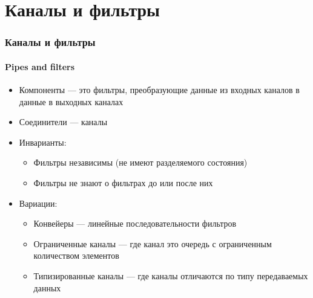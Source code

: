 \documentclass{../../slides-style}
\begin{document}
    \section{Каналы и фильтры}

    \begin{frame}
        \frametitle{Каналы и фильтры}
        \framesubtitle{Pipes and filters}
        \begin{itemize}
            \item Компоненты --- это фильтры, преобразующие данные из входных каналов в данные в выходных каналах
            \item Соединители --- каналы
            \item Инварианты:
            \begin{itemize}
                \item Фильтры независимы (не имеют разделяемого состояния)
                \item Фильтры не знают о фильтрах до или после них
            \end{itemize}
            \item Вариации:
            \begin{itemize}
                \item Конвейеры --- линейные последовательности фильтров
                \item Ограниченные каналы --- где канал это очередь с ограниченным количеством элементов
                \item Типизированные каналы --- где каналы отличаются по типу передаваемых данных
            \end{itemize}
        \end{itemize}
    \end{frame}
\end{document}
